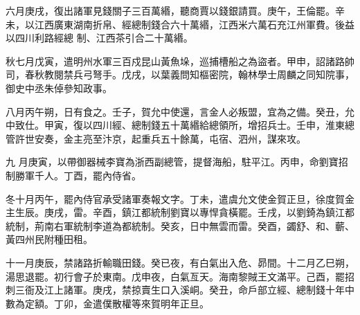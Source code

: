 \begin{pinyinscope}
 六月庚戌，復出諸軍見錢關子三百萬緡，聽商賈以錢銀請買。庚午，王倫罷。辛未，以江西廣東湖南折帛、經總制錢合六十萬緡，江西米六萬石充江州軍費。後益以四川利路經總
 制、江西茶引合二十萬緡。



 秋七月戊寅，遣明州水軍三百戍昆山黃魚垛，巡捕槽船之為盜者。甲申，詔諸路帥司，春秋教閱禁兵弓弩手。戊戌，以葉義問知樞密院，翰林學士周麟之同知院事，御史中丞朱倬參知政事。



 八月丙午朔，日有食之。壬子，賀允中使還，言金人必叛盟，宜為之備。癸丑，允中致仕。甲寅，復以四川經、總制錢五十萬緡給總領所，增招兵士。壬申，淮東總管許世安奏，金主亮至汴京，起重兵五十餘萬，屯宿、泗州，謀來攻。



 九
 月庚寅，以帶御器械李寶為浙西副總管，提督海船，駐平江。丙申，命劉寶招制勝軍千人。丁酉，罷內侍省。



 冬十月丙午，罷內侍官承受諸軍奏報文字。丁未，遣虞允文使金賀正旦，徐度賀金主生辰。庚戌，雷。辛酉，鎮江都統制劉寶以專悍貪橫罷。壬戌，以劉錡為鎮江都統制，荊南右軍統制李道為都統制。癸亥，日中無雲而雷。癸酉，蠲舒、和、蘄、黃四州民附種田租。



 十一月庚辰，禁諸路折輸職田錢。癸已夜，有白氣出入危、昴間。十二月乙巳朔，
 湯思退罷。初行會子於東南。戊申夜，白氣亙天。海南黎賊王文滿平。己酉，罷招刺三衙及江上諸軍。庚戌，禁掠賣生口入溪峒。癸丑，命戶部立經、總制錢十年中數為定額。丁卯，金遣僕散權等來賀明年正旦。



\end{pinyinscope}